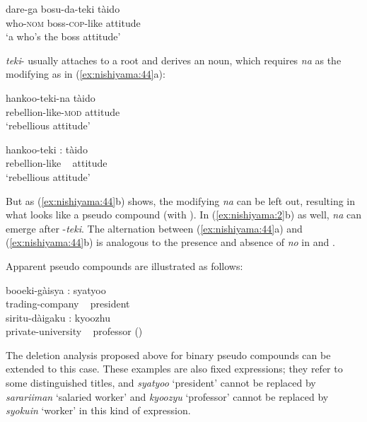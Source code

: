 \documentclass[output=paper]{LSP/langsci}
\begin{document}
\begin{exe}%

{}
    \gll dare-ga    bosu-da-teki      tàido\\
    who-\textsc{nom}  boss-\textsc{cop}-like  attitude\\
\glt ‘a who’s the boss attitude’
    \z

\textit{teki}{}- usually attaches to a root and derives an  noun, which requires \textit{na} as the modifying  as in (\ref{ex:nishiyama:44}a):

\ea\label{ex:nishiyama:44}
 \ea  
\gll hankoo-teki-na     tàido\\
    rebellion-like-\textsc{mod}  attitude\\
\glt ‘rebellious attitude’
 
 \ex
\gll   hankoo-teki :  tàido\\
    rebellion-like  ~ attitude\\

\glt ‘rebellious attitude’
\z \z

But as (\ref{ex:nishiyama:44}b) shows, the modifying  \textit{na} can be left out, resulting in what looks like a pseudo compound (with ). In (\ref{ex:nishiyama:2}b) as well, \textit{na} can emerge after -\textit{teki}. The alternation between (\ref{ex:nishiyama:44}a) and (\ref{ex:nishiyama:44}b) is analogous to the presence and absence of \textit{no} in  and .

  Apparent  pseudo compounds are illustrated as follows:

\ea\label{ex:nishiyama:45}
 \ea
\gll  booeki-gàisya : syatyoo\\
    trading-company ~ president\\

  \ex
\gll  siritu-dàigaku : kyoozhu\\
    private-university ~ professor    (\citealt[518f]{Kageyama2009})\\
\z \z

The  deletion analysis proposed above for binary pseudo compounds can be extended to this case. These examples are also fixed expressions; they refer to some distinguished titles, and \textit{syatyoo} ‘president’ cannot be replaced by \textit{sarariiman} `salaried worker’ and \textit{kyoozyu} ‘professor’ cannot be replaced by \textit{syokuin} ‘worker’ in this kind of expression.


\end{exe}
\end{document}
